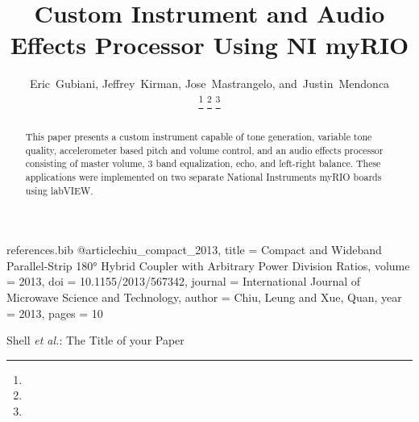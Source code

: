 \begin{filecontents*}{references.bib}
@article{chiu_compact_2013,
	title = {Compact and Wideband Parallel-Strip 180° Hybrid Coupler with Arbitrary Power Division Ratios},
	volume = {2013},
	doi = {10.1155/2013/567342},
	journal = {International Journal of Microwave Science and Technology},
	author = {Chiu, Leung and Xue, Quan},
	year = {2013},
	pages = {10}
}
\end{filecontents*}
%


%
\title{Custom Instrument and Audio Effects Processor Using NI myRIO}
%
%
%

\author{Eric~Gubiani, Jeffrey~Kirman, Jose~Mastrangelo, and~Justin~Mendonca

\thanks{ 
 }
\thanks{}%
\thanks{}%
}


\markboth{}%
{Shell \MakeLowercase{\textit{et al.}}: The Title of your Paper}
%

\maketitle

\begin{abstract}
This paper presents a custom instrument capable of tone generation, variable tone quality, accelerometer based pitch and volume control, and an audio effects processor consisting of master volume, 3 band equalization, echo, and left-right balance. 
These applications were implemented on two separate National Instruments myRIO boards using labVIEW. 
\end{abstract}

